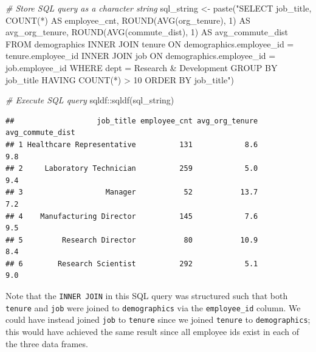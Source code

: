 \documentclass[
]{book}
\newenvironment{Shaded}{\begin{snugshade}}{\end{snugshade}}
\newcommand{\CommentTok}[1]{\textcolor[rgb]{0.56,0.35,0.01}{\textit{#1}}}
\newcommand{\FunctionTok}[1]{\textcolor[rgb]{0.00,0.00,0.00}{#1}}
\newcommand{\NormalTok}[1]{#1}
\newcommand{\OtherTok}[1]{\textcolor[rgb]{0.56,0.35,0.01}{#1}}
\newcommand{\SpecialCharTok}[1]{\textcolor[rgb]{0.00,0.00,0.00}{#1}}
\newcommand{\StringTok}[1]{\textcolor[rgb]{0.31,0.60,0.02}{#1}}
\begin{document}
\begin{Shaded}
\begin{Highlighting}[]
\CommentTok{\# Store SQL query as a character string}
\NormalTok{sql\_string }\OtherTok{\textless{}{-}} \FunctionTok{paste}\NormalTok{(}\StringTok{"SELECT}
\StringTok{                      job\_title,}
\StringTok{                      COUNT(*) AS employee\_cnt,}
\StringTok{                      ROUND(AVG(org\_tenure), 1) AS avg\_org\_tenure,}
\StringTok{                      ROUND(AVG(commute\_dist), 1) AS avg\_commute\_dist}
\StringTok{                    FROM}
\StringTok{                        demographics}
\StringTok{                      INNER JOIN}
\StringTok{                        tenure}
\StringTok{                      ON}
\StringTok{                        demographics.employee\_id = tenure.employee\_id}
\StringTok{                      INNER JOIN}
\StringTok{                        job}
\StringTok{                      ON}
\StringTok{                        demographics.employee\_id = job.employee\_id}
\StringTok{                    WHERE}
\StringTok{                      dept = \textquotesingle{}Research \& Development\textquotesingle{}}
\StringTok{                    GROUP BY}
\StringTok{                      job\_title}
\StringTok{                    HAVING}
\StringTok{                      COUNT(*) \textgreater{} 10}
\StringTok{                    ORDER BY}
\StringTok{                      job\_title"}\NormalTok{)}

\CommentTok{\# Execute SQL query}
\NormalTok{sqldf}\SpecialCharTok{::}\FunctionTok{sqldf}\NormalTok{(sql\_string)}
\end{Highlighting}
\end{Shaded}

\begin{verbatim}
##                   job_title employee_cnt avg_org_tenure avg_commute_dist
## 1 Healthcare Representative          131            8.6              9.8
## 2     Laboratory Technician          259            5.0              9.4
## 3                   Manager           52           13.7              7.2
## 4    Manufacturing Director          145            7.6              9.5
## 5         Research Director           80           10.9              8.4
## 6        Research Scientist          292            5.1              9.0
\end{verbatim}

Note that the \texttt{INNER\ JOIN} in this SQL query was structured such that both \texttt{tenure} and \texttt{job} were joined to \texttt{demographics} via the \texttt{employee\_id} column. We could have instead joined \texttt{job} to \texttt{tenure} since we joined \texttt{tenure} to \texttt{demographics}; this would have achieved the same result since all employee ids exist in each of the three data frames.
\end{document}
